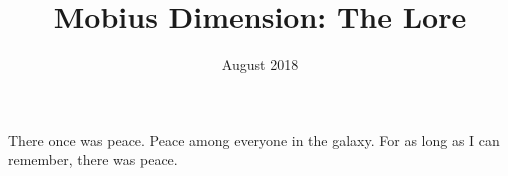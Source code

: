 \documentclass{article}
\title{Mobius Dimension: The Lore}
\author{}
\date{August 2018}
\begin{document}
\maketitle
\newpage

There once was peace. Peace among everyone in the galaxy. For as long as I can remember, there was peace. 
    
\end{document}

